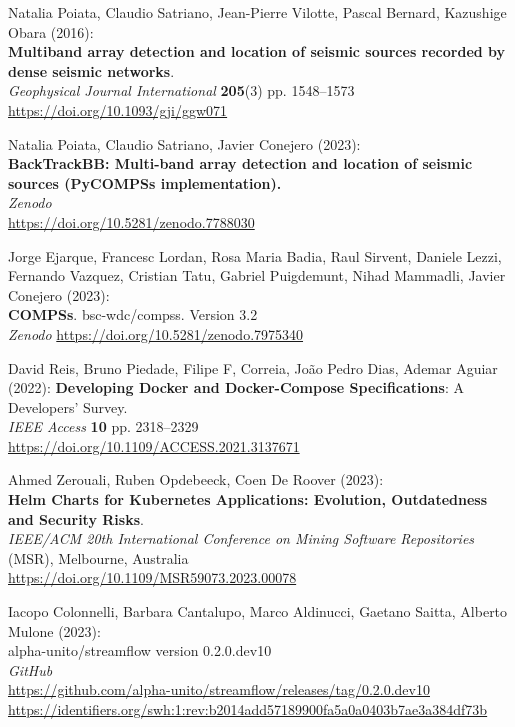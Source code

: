 \documentclass[10pt,letterpaper]{article}
\begin{document}
\begin{thebibliography}{10}
\begin{small}
Natalia Poiata, Claudio Satriano, Jean-Pierre Vilotte, Pascal Bernard, Kazushige Obara (2016):\\
\textbf{Multiband array detection and location of seismic sources recorded by dense seismic networks}.\\
\emph{Geophysical Journal International} \textbf{205}(3) pp. 1548--1573\\
\url{https://doi.org/10.1093/gji/ggw071}

Natalia Poiata, Claudio Satriano, Javier Conejero (2023):\\
\textbf{BackTrackBB: Multi-band array detection and location of seismic sources (PyCOMPSs implementation).}\\
\emph{Zenodo}\\
\url{https://doi.org/10.5281/zenodo.7788030}

Jorge Ejarque, Francesc Lordan, Rosa Maria Badia, Raul Sirvent, Daniele Lezzi, Fernando Vazquez, Cristian Tatu,  Gabriel Puigdemunt, Nihad Mammadli, Javier Conejero (2023):\\
\textbf{COMPSs}. bsc-wdc/compss. Version 3.2\\
\emph{Zenodo}
\url{https://doi.org/10.5281/zenodo.7975340}

David Reis, Bruno Piedade, Filipe F, Correia, João Pedro Dias, Ademar Aguiar (2022):
\textbf{Developing Docker and Docker-Compose Specifications}: A Developers’ Survey.\\
\emph{IEEE Access} \textbf{10} pp. 2318--2329 \\
\url{https://doi.org/10.1109/ACCESS.2021.3137671}

Ahmed Zerouali, Ruben Opdebeeck, Coen De Roover (2023):\\
\textbf{Helm Charts for Kubernetes Applications: Evolution, Outdatedness and Security Risks}.\\
\emph{IEEE/ACM 20th International Conference on Mining Software Repositories} (MSR), Melbourne, Australia \\
\url{https://doi.org/10.1109/MSR59073.2023.00078}

 Iacopo Colonnelli, Barbara Cantalupo, Marco Aldinucci, Gaetano Saitta, Alberto Mulone (2023):\\
alpha-unito/streamflow version 0.2.0.dev10\\
\emph{GitHub}\\
\url{https://github.com/alpha-unito/streamflow/releases/tag/0.2.0.dev10}\\
\url{https://identifiers.org/swh:1:rev:b2014add57189900fa5a0a0403b7ae3a384df73b}


\end{small}
\end{thebibliography}
\end{document}
